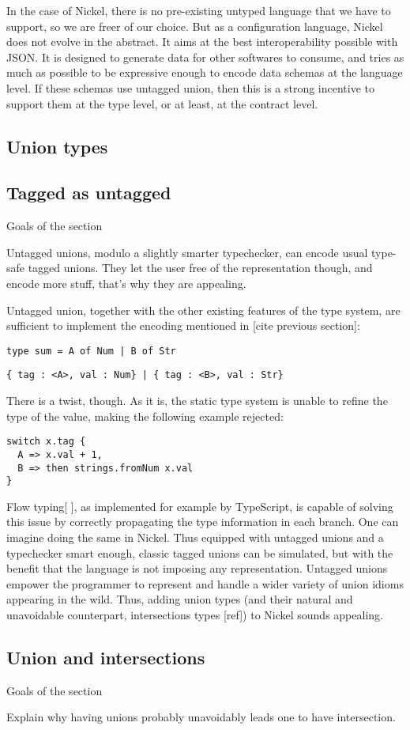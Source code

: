 \documentclass{article}
\begin{document}
In the case of Nickel, there is no pre-existing untyped language that we have to
support, so we are freer of our choice. But as a configuration language, Nickel
does not evolve in the abstract. It aims at the best interoperability possible
with JSON. It is designed to generate data for other softwares to consume, and
tries as much as possible to be expressive enough to encode data schemas at the
language level. If these schemas use untagged union, then this is a strong
incentive to support them at the type level, or at least, at the contract level.

\subsection{Union types}

\subsection{Tagged as untagged}
\color{red}Goals of the section

Untagged unions, modulo a slightly smarter typechecker, can encode usual type-safe
tagged unions. They let the user free of the representation though, and encode
more stuff, that's why they are appealing.\vspace{0.5cm}\color{black}

Untagged union, together with the other existing features of the type system,
are sufficient to implement the encoding mentioned in [cite previous section]:

\begin{lstlisting}
type sum = A of Num | B of Str
\end{lstlisting}

\begin{lstlisting}
{ tag : <A>, val : Num} | { tag : <B>, val : Str}
\end{lstlisting}

There is a twist, though. As it is, the static type system is unable to refine
the type of the value, making the following example rejected:

\begin{lstlisting}
switch x.tag {
  A => x.val + 1,
  B => then strings.fromNum x.val
}
\end{lstlisting}

Flow typing[ ], as implemented for example by TypeScript, is capable of solving
this issue by correctly propagating the type information in each branch. One can
imagine doing the same in Nickel. Thus equipped with untagged unions and a
typechecker smart enough, classic tagged unions can be simulated, but with the
benefit that the language is not imposing any representation. Untagged unions
empower the programmer to represent and handle a wider variety of union idioms
appearing in the wild. Thus, adding union types (and their natural and
unavoidable counterpart, intersections types [ref]) to Nickel sounds appealing.

\subsection{Union and intersections}
\color{red}Goals of the section

Explain why having unions probably unavoidably leads one to have intersection.\vspace{0.5cm}\color{black}


\printbibliography
\end{document}
